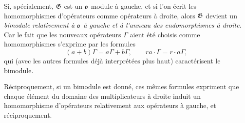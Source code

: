 Si, spécialement, $\mathfrak{G}$ est un $\mathfrak{o}$-module à gauche, et si l'on écrit les homomorphismes d'opérateurs comme opérateurs à droite, alors $\mathfrak{G}$ devient un \emph{bimodule relativement à $\mathfrak{o}$ à gauche et à l'anneau des endomorphismes à droite}. Car le fait que les nouveaux opérateurs $\Gamma$ aient été choisis comme homomorphismes s'exprime par les formules
\[
        (a+b)\Gamma=a\Gamma+b\Gamma,
        \qquad ra\cdot\Gamma=r\cdot a\Gamma,
\]
qui (avec les autres formules déjà interprétées plus haut) caractérisent le bimodule.

Réciproquement, si un bimodule est donné, ces mêmes formules expriment que chaque élément du domaine des multiplicateurs à droite induit un homomorphisme d'opérateurs relativement aux opérateurs à gauche, et réciproquement.
